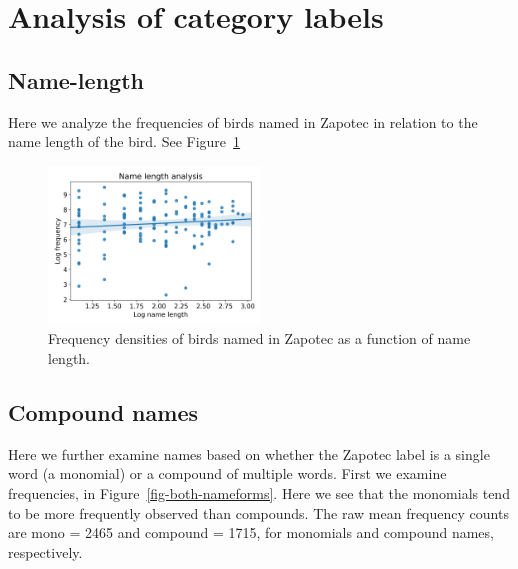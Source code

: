 \documentclass[10pt,letterpaper]{article}
\begin{document}
\section{Analysis of category labels}

\subsection{Name-length}
Here we analyze the frequencies of birds named in Zapotec in relation to the name length of the bird. See Figure~\ref{fig-freq-namelength}

\begin{figure}[ht!]
  \begin{center}
    \includegraphics[width=0.5\textwidth]{./figures/freq-namelength.png}
        \caption{Frequency densities of birds named in Zapotec as a function of name length.}
        \label{fig-freq-namelength}
  \end{center}
\end{figure}

\subsection{Compound names}
Here we further examine names based on whether the Zapotec label is a single word (a monomial) or a compound of multiple words. First we examine frequencies, in Figure~\ref{fig-both-nameforms}. Here we see that the monomials tend to be more frequently observed than compounds. The raw mean frequency counts are mono = 2465 and compound = 1715, for monomials and compound names, respectively.

\end{document}
